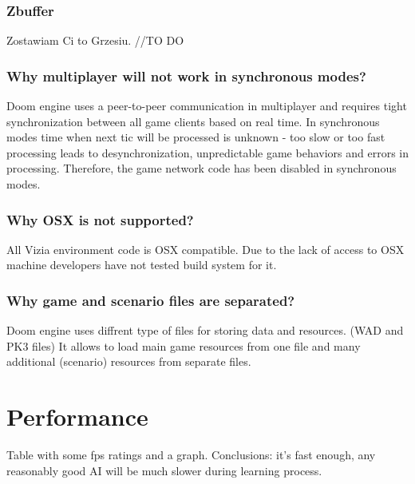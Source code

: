 \subsubsection{Zbuffer}

Zostawiam Ci to Grzesiu. //TO DO

\subsubsection{Why multiplayer will not work in synchronous modes?}

Doom engine uses a peer-to-peer communication in multiplayer and requires tight synchronization between all game clients based on real time.
In synchronous modes time when next tic will be processed is unknown - too slow or too fast processing leads to desynchronization, unpredictable game behaviors and errors in processing. Therefore, the game network code has been disabled in synchronous modes.

\subsubsection{Why OSX is not supported?}

All Vizia environment code is OSX compatible. Due to the lack of access to OSX machine developers have not tested build system for it.

\subsubsection{Why game and scenario files are separated?}

Doom engine uses diffrent type of files for storing data and resources. (WAD and PK3 files) It allows to load main game resources from one file and many additional (scenario) resources from separate files. 

\section{Performance}
Table with some fps ratings and a graph.
Conclusions: it's fast enough, any reasonably good AI will be much slower during learning process.



